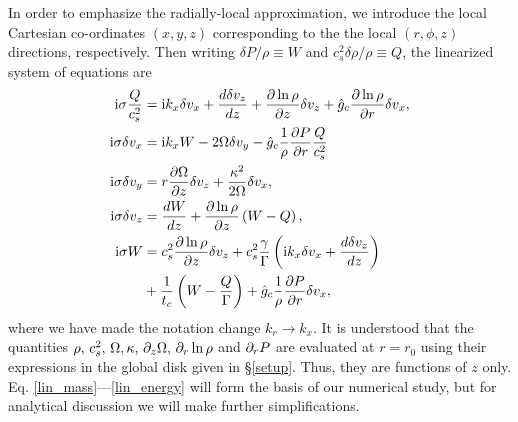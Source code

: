 In order to emphasize the radially-local approximation, we
introduce the local Cartesian co-ordinates $(x,y,z)$ corresponding to
the the local $(r,\phi,z)$ directions, respectively. Then writing
$\delta P /\rho \equiv W$ and $c_s^2\delta\rho/\rho\equiv Q$, the
linearized system of equations are 
\begin{align}
  \mathrm{i}\sigma \frac{Q}{c_s^2}  &=  \mathrm{i} k_x \delta v_x + \frac{d\delta
    v_z}{dz} + \frac{\partial\ln{\rho}}{\partial z}\delta v_z + \hat{g}_c
  \frac{\partial\ln{\rho}}{\partial r} \delta v_x,\label{lin_mass}\\
  \mathrm{i}\sigma \delta v_x  &= \mathrm{i} k_x W - 2\Omega\delta v_y -
  \hat{g}_c\frac{1}{\rho}\frac{\partial P}{\partial r}\frac{Q}{c_s^2}\label{lin_vx}\\
   \mathrm{i} \sigma\delta v_y &= r\frac{\partial \Omega}{\partial z}\delta v_z +
  \frac{\kappa^2}{2\Omega}\delta v_x, \label{lin_vy}\\
   \mathrm{i}\sigma\delta v_z &= \frac{dW}{dz} +
  \frac{\partial\ln{\rho}}{\partial z}\left(W-Q\right), \label{lin_vz}\\
  \mathrm{i} \sigma W &= c_s^2\frac{\partial\ln{\rho}}{\partial z}\delta v_z +
  c_s^2\frac{\gamma}{\Gamma} \left(\mathrm{i} k_x\delta v_x + \frac{d\delta
      v_z}{dz}\right) \notag\\
  &+ \frac{1}{t_c}\left(W - \frac{Q}{\Gamma}\right) +
  \hat{g}_c\frac{1}{\rho}\frac{\partial P}{\partial r}\delta v_x,\label{lin_energy}
\end{align}
where we have made the notation change $k_r\to k_x$. 
It is understood that the quantities $\rho,\,c_s^2,\,\Omega,\kappa,\, 
\partial_z\Omega,\, \partial_r\ln{\rho} $ and $ \partial_r P$ are evaluated at $r=r_0$
using their expressions in the global disk given in \S\ref{setup}. Thus, they are functions of $z$ only. 
Eq. \ref{lin_mass}---\ref{lin_energy} will form the basis of our numerical
study, but for analytical discussion
we will make further simplifications. 


